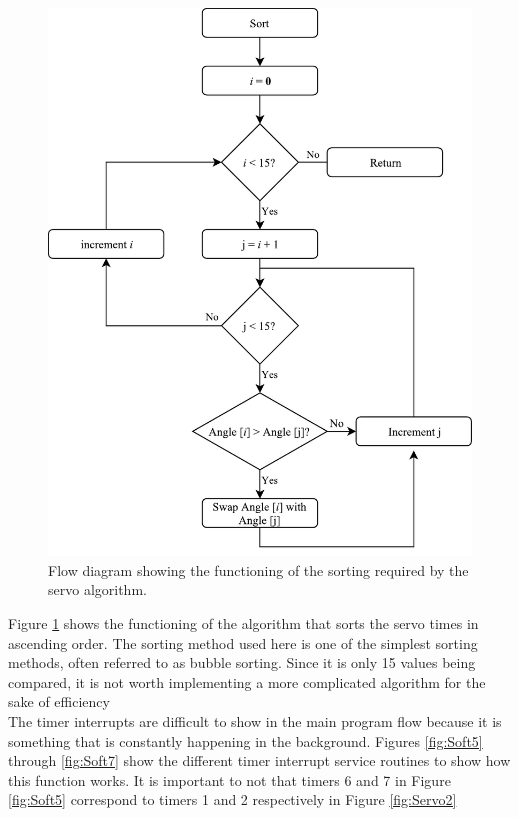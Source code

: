 \begin{figure}[H]
\centering
\includegraphics[scale = 1]{pics/Soft4.pdf}
\caption{Flow diagram showing the functioning of the sorting required by the servo algorithm.}
\label{fig:Soft4}
\end{figure}

Figure \ref{fig:Soft4} shows the functioning of the algorithm that sorts the servo times in ascending order. The sorting method used here is one of the simplest sorting methods, often referred to as bubble sorting. Since it is only 15 values being compared, it is not worth implementing a more complicated algorithm for the sake of efficiency\\

The timer interrupts are difficult to show in the main program flow because it is something that is constantly happening in the background. Figures \ref{fig:Soft5} through \ref{fig:Soft7} show the different timer interrupt service routines to show how this function works. It is important to not that timers 6 and 7 in Figure \ref{fig:Soft5} correspond to timers 1 and 2 respectively in Figure \ref{fig:Servo2} \\

